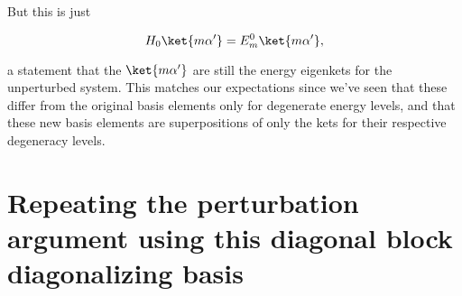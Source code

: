 But this is just

\begin{equation}\label{eqn:pertubationDegeneracy:490}
H_0 \ket{m \alpha'} = E_m^0 \ket{m \alpha'},
\end{equation}

a statement that the $\ket{m \alpha'}$ are still the energy eigenkets for the unperturbed system.  This matches our expectations since we've seen that these differ from the original basis elements only for degenerate energy levels, and that these new basis elements are superpositions of only the kets for their respective degeneracy levels.

\section{Repeating the perturbation argument using this diagonal block diagonalizing basis}

\EndArticle
